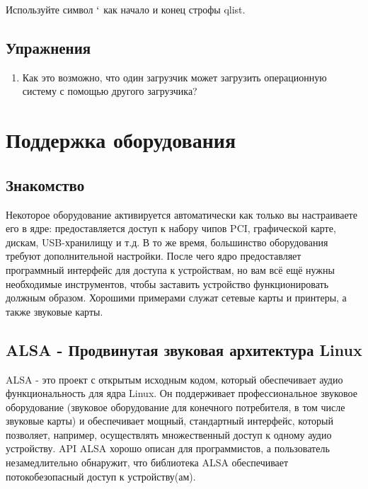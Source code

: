 \documentclass[10pt]{book}
\begin{document}
Используйте символ $`$ как начало и конец строфы  qlist.

\newpage

{\color{white}\section{Упражнения}}
\begin{tcolorbox}[title=\textbf{Упражнения}, colback=yellow!14!white, colframe=red!75!white]
\begin{enumerate}
\item Как это возможно, что один загрузчик может загрузить операционную систему с помощью другого
загрузчика?
\end{enumerate}
\end{tcolorbox}

\newpage

\chapter{Поддержка оборудования}

\section*{Знакомство}

Некоторое оборудование активируется автоматически как только вы настраиваете его в ядре: предоставляется доступ к набору чипов PCI, графической карте, дискам, USB-хранилищу и т.д. В то же время, большинство оборудования требуют дополнительной настройки. После чего ядро предоставляет программный интерфейс для доступа к устройствам, но вам всё ещё нужны необходимые инструментов, чтобы заставить устройство функционировать должным образом. Хорошими примерами служат сетевые карты и принтеры, а также звуковые карты.

\section{ALSA - Продвинутая звуковая архитектура Linux}

ALSA - это проект с открытым исходным кодом, который обеспечивает аудио функциональность для ядра Linux. Он поддерживает профессиональное звуковое оборудование (звуковое оборудование для конечного потребителя, в том числе звуковые карты) и обеспечивает мощный, стандартный интерфейс, который позволяет, например, осуществлять множественный доступ к одному аудио устройству. API ALSA хорошо описан для программистов, а пользователь незамедлительно обнаружит, что библиотека ALSA обеспечивает потокобезопасный доступ к устройству(ам).
\end{document}
